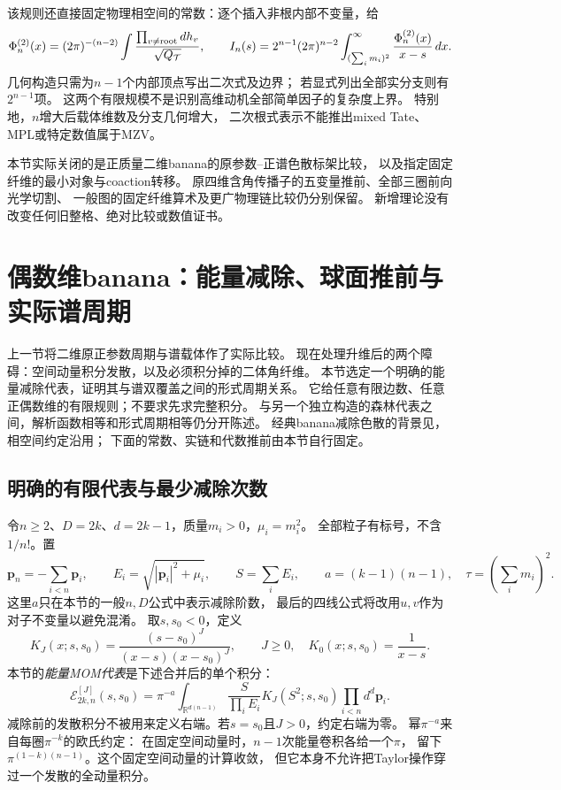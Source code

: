 \documentclass[11pt,a4paper]{ctexart}
\theoremstyle{cnplain}\newtheorem{theorem}{定理}[section]
\theoremstyle{definition}\newtheorem{definition}[theorem]{定义}
\theoremstyle{remark}\newtheorem{remark}[theorem]{注}
\begin{document}
该规则还直接固定物理相空间的常数：逐个插入非根内部不变量，给
\[
 \Phi_n^{(2)}(x)=(2\pi)^{-(n-2)}
     \int\frac{\prod_{v\ne{\rm root}}dh_v}{\sqrt{Q_{\mathcal T}}},\qquad
 I_n(s)=2^{n-1}(2\pi)^{n-2}
     \int_{(\sum_i m_i)^2}^{\infty}\frac{\Phi_n^{(2)}(x)}{x-s}\,dx.
\]
几何构造只需为$n-1$个内部顶点写出二次式及边界；
若显式列出全部实分支则有$2^{n-1}$项。
这两个有限规模不是识别高维动机全部简单因子的复杂度上界。
特别地，$n$增大后载体维数及分支几何增大，
二次根式表示不能推出mixed Tate、MPL或特定数值属于MZV。

本节实际关闭的是正质量二维banana的原参数--正谱色散标架比较，
以及指定固定纤维的最小对象与coaction转移。
原四维含角传播子的五变量推前、全部三圈前向光学切割、
一般图的固定纤维算术及更广物理链比较仍分别保留。
新增理论没有改变任何旧整格、绝对比较或数值证书。


\section{偶数维banana：能量减除、球面推前与实际谱周期}\label{sec:evenenergymom}

上一节将二维原正参数周期与谱载体作了实际比较。
现在处理升维后的两个障碍：空间动量积分发散，以及必须积分掉的二体角纤维。
本节选定一个明确的能量减除代表，证明其与谱双覆盖之间的形式周期关系。
它给任意有限边数、任意正偶数维的有限规则；不要求先求完整积分。
与另一个独立构造的森林代表之间，解析函数相等和形式周期相等仍分开陈述。
经典banana减除色散的背景见\cite{KreimerBanana}，相空间约定沿用\cite{PDGphase}；
下面的常数、实链和代数推前由本节自行固定。

\subsection{明确的有限代表与最少减除次数}

令$n\geq2$、$D=2k$、$d=2k-1$，质量$m_i>0$，$\mu_i=m_i^2$。
全部粒子有标号，不含$1/n!$。置
\[
 \boldsymbol p_n=-\sum_{i<n}\boldsymbol p_i,\qquad
 E_i=\sqrt{|\boldsymbol p_i|^2+\mu_i},\qquad S=\sum_i E_i,
 \qquad a=(k-1)(n-1),\quad \tau=(\sum_i m_i)^2.
\]
这里$a$只在本节的一般$n,D$公式中表示减除阶数，
最后的四线公式将改用$u,v$作为对子不变量以避免混淆。
取$s,s_0<0$，定义
\begin{equation}\label{eq:energymomkernel}
 K_J(x;s,s_0)=\frac{(s-s_0)^J}{(x-s)(x-s_0)^J},\qquad J\geq0,
 \quad K_0(x;s,s_0)=\frac1{x-s}.
\end{equation}
本节的\emph{能量MOM代表}是下述合并后的单个积分：
\begin{equation}\label{eq:energymomdefinition}
 \mathcal E_{2k,n}^{[J]}(s,s_0)=\pi^{-a}
 \int_{\mathbb R^{d(n-1)}}
       \frac{S}{\prod_i E_i}K_J(S^2;s,s_0)
       \prod_{i<n}d^d\boldsymbol p_i .
\end{equation}
减除前的发散积分不被用来定义右端。若$s=s_0$且$J>0$，约定右端为零。
幂$\pi^{-a}$来自每圈$\pi^{-k}$的欧氏约定：
在固定空间动量时，$n-1$次能量卷积各给一个$\pi$，
留下$\pi^{(1-k)(n-1)}$。这个固定空间动量的计算收敛，
但它本身不允许把Taylor操作穿过一个发散的全动量积分。
\end{document}
